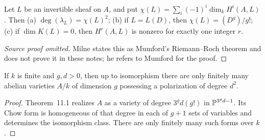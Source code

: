 \begin{theorem}\label{thm:milne-polarization-riemann-roch}
Let $L$ be an invertible sheaf on $A$, and put $\chi(L)=\sum_i(-1)^i\dim_kH^i(A,L)$. Then (a) $\deg(\lambda_L)=\chi(L)^2$; (b) if $L=L(D)$, then $\chi(L)=(D^g)/g!$; (c) if $\dim K(L)=0$, then $H^r(A,L)$ is nonzero for exactly one integer $r$.
\end{theorem}

\begin{proof}[Source proof omitted]
Milne states this as Mumford's Riemann--Roch theorem and does not prove it in
these notes; he refers to Mumford for the proof.
\end{proof}

\begin{theorem}\label{thm:milne-polarization-finiteness}
If $k$ is finite and $g,d>0$, then up to isomorphism there are only finitely many abelian varieties $A/k$ of dimension $g$ possessing a polarization of degree $d^2$.
\end{theorem}

\begin{proof}

Theorem~11.1 realizes $A$ as a variety of degree $3^gd(g!)$ in $\mathbb{P}^{3^gd-1}$. Its Chow form is homogeneous of that degree in each of $g+1$ sets of variables and determines the isomorphism class. There are only finitely many such forms over $k$.

\end{proof}


